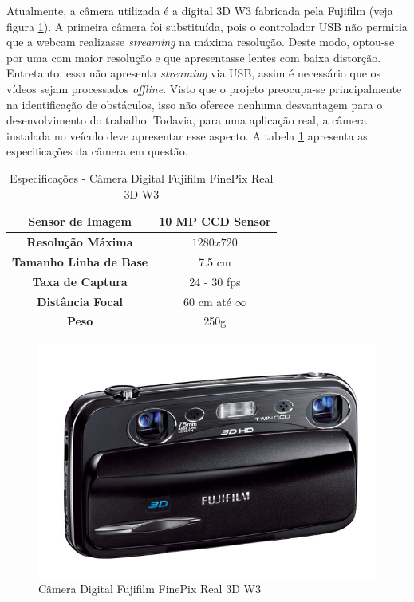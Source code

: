Atualmente, a câmera utilizada é a digital 3D W3 fabricada pela Fujifilm (veja figura \ref{fujiW3}). A primeira câmera foi substituída, pois o controlador USB não permitia que a webcam realizasse \textit{streaming} na máxima resolução. Deste modo, optou-se por uma com maior resolução e que apresentasse lentes com baixa distorção. Entretanto, essa não apresenta \textit{streaming} via USB, assim é necessário que os vídeos sejam processados \textit{offline}. Visto que o projeto preocupa-se principalmente na identificação de obstáculos, isso não oferece nenhuma desvantagem para o desenvolvimento do trabalho. Todavia, para uma aplicação real, a câmera instalada no veículo deve apresentar esse aspecto. A tabela \ref{fujiW3_tab} apresenta as especificações da câmera em questão.

\begin{table}[]
\centering
\caption{Especificações - Câmera Digital Fujifilm FinePix Real 3D W3}
\label{fujiW3_tab}
\begin{tabular}{|c|c|}
\hline
\textbf{Sensor de Imagem}      & 10 MP CCD Sensor  	\\	\hline
\textbf{Resolução Máxima}      & $1280x720$        	\\	\hline
\textbf{Tamanho Linha de Base} & 7.5 cm             	\\	\hline
\textbf{Taxa de Captura}      & 24 - 30 fps          	\\	\hline
\textbf{Distância Focal}       & 60 cm até $\infty$	\\	\hline
\textbf{Peso}       		      & 250g		\\	\hline
\end{tabular}
\end{table}

\begin{figure}[H]
	\centering
	\includegraphics[scale=0.35]{./Resources/fujiW3.jpg}
	\caption{Câmera Digital Fujifilm FinePix Real 3D W3}
	\label{fujiW3}
\end{figure}


